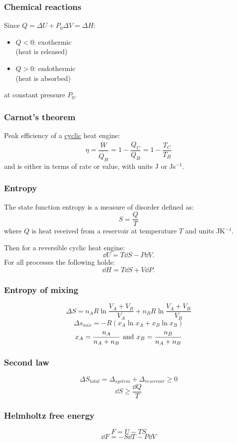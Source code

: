 \documentclass{article}
\begin{document}
\begin{multicols*}{3}
\subsubsection*{Chemical reactions}
Since
$Q=\Delta U+P_0\Delta V=\Delta H$:
\begin{itemize}
    \item $Q<0$: exothermic \\
    (heat is released)
    \item $Q>0$: endothermic \\
    (heat is absorbed)
\end{itemize}
at constant pressure $P_0$.

\subsubsection*{Carnot's theorem}
Peak efficiency of a \underline{cyclic}
heat engine:
$$\eta=\frac{\dot{W}}{\dot{Q_H}}=1-\frac{Q_C}{Q_H}
=1-\frac{T_C}{T_H}$$
and is either in terms of rate or value, 
with units J or Js$^{-1}$.

\subsubsection*{Entropy}
The state function entropy is a measure
of disorder defined as:
$$S=\frac{Q}{T}$$
where $Q$ is heat received from a reservoir
at temperature $T$
and units JK$^{-1}$.

Then for a reversible cyclic heat engine:
$$\dd U=T\dd S-P\dd V.$$
For all processes the following holds:
$$\dd H=T\dd S+V\dd P.$$

\subsubsection*{Entropy of mixing}
$$\Delta S=n_A R\ln\frac{V_A+V_B}{V_A}
+n_B R\ln\frac{V_A+V_B}{V_B}$$
$$\Delta s_{mix}=-R(x_A\ln x_A+x_B\ln x_B)$$
$$x_A=\frac{n_A}{n_A+n_B}
\hspace{0.05in}\text{and}\hspace{0.05in}
x_B=\frac{n_B}{n_A+n_B}$$

\subsubsection*{Second law}
$$\Delta S_{total}=\Delta_{system}
+\Delta_{reservoir}\geq0$$
$$\dd S\geq\frac{\dd Q}{T}$$

\subsubsection*{Helmholtz free energy}
$$F=U-TS$$
$$\dd F=-S\dd T-P\dd V$$


\end{multicols*}
\end{document}
